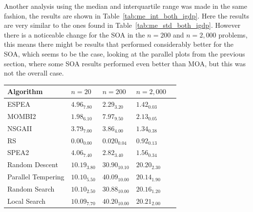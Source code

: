 Another analysis using the median and interquartile range was made in the same fashion, the results are shown in Table~\ref{tab:me_int_both_igdp}. Here the results are very similar to the ones found in Table~\ref{tab:me_std_both_igdp}. However there is a noticeable change for the SOA in the $n=200$ and $n=2,000$ problems, this means there might be results that performed considerably better for the SOA, which seems to be the case, looking at the parallel plots from the previous section, where some SOA results performed even better than MOA, but this was not the overall case.

\begin{table}[H]
    \centering
    {%
    \begin{tabular}{lllll}
    \hline
    Algorithm & $n=20$ & $n=200$ & $n=2,000$ \\
    \hline
    ESPEA                & $  4.96_{7.80}$                    & \cellcolor{gray25}$  2.29_{3.20}$    & $  1.42_{0.03}$                  \\
    MOMBI2                & \cellcolor{gray25}$  1.98_{6.10}$  & $  7.97_{ 9.50}$                     & $  2.13_{0.05}$                 \\
    NSGAII               & $  3.79_{7.00}$                    & $  3.86_{ 4.00}$                     & \cellcolor{gray25}$  1.34_{0.38}$\\
    RS                   & \cellcolor{gray95}$  0.00_{0.00}$  & \cellcolor{gray95}$  0.020_{ 0.04}$  & \cellcolor{gray95}$  0.92_{0.13}$\\
    SPEA2                & $  4.06_{7.40}$                   & $  2.82_{3.40}$                      & $  1.56_{0.34}$                  \\
    Random Descent       & $  10.19_{3.80}$                   & $  30.90_{ 10.10}$                   & $  20.20_{2.30}$                 \\
    Parallel Tempering   & $  10.10_{5.50}$                   & $  40.09_{ 10.00}$                   & $  20.14_{1.90}$                 \\
    Random Search        & $  10.10_{2.50}$                   & $  30.88_{ 10.00}$                   & $  20.16_{1.20}$                 \\
    Local Search         & $  10.09_{7.70}$                   & $  40.20_{ 10.00}$                   & $  20.21_{2.00}$                 \\

\end{tabular}}
\end{table}

